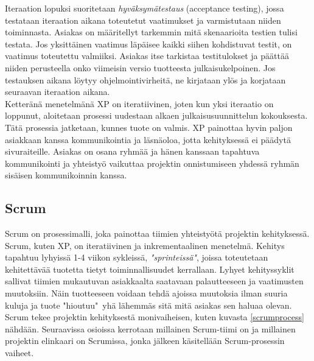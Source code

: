 \documentclass[finnish]{../tktltiki2}
\theoremstyle{definition}
\theoremstyle{remark}
\begin{document}
Iteraation lopuksi suoritetaan \emph{hyväksymätestaus} (acceptance testing), jossa testataan iteraation aikana toteutetut vaatimukset ja varmistutaan niiden toiminnasta. Asiakas on määritellyt tarkemmin mitä skenaarioita testien tulisi testata. Jos yksittäinen vaatimus läpäisee kaikki siihen kohdistuvat testit, on vaatimus toteutettu valmiiksi. Asiakas itse tarkistaa testitulokset ja päättää niiden perusteella onko viimeisin versio tuotteesta julkaisukelpoinen. Jos testauksen aikana löytyy ohjelmointivirheitä, ne kirjataan ylös ja korjataan seuraavan iteraation aikana.\\

Ketteränä menetelmänä XP on iteratiivinen, joten kun yksi iteraatio on loppunut, aloitetaan prosessi uudestaan alkaen julkaisusuunnittelun kokouksesta. Tätä prosessia jatketaan, kunnes tuote on valmis. XP painottaa hyvin paljon asiakkaan kanssa kommunikointia ja läsnäoloa, jotta kehityksessä ei päädytä sivuraiteille. Asiakas on osana ryhmää ja hänen kanssaan tapahtuva kommunikointi ja yhteistyö vaikuttaa projektin onnistumiseen yhdessä ryhmän sisäisen kommunikoinnin kanssa.

\subsection{Scrum}

Scrum on prosessimalli, joka painottaa tiimien yhteistyötä projektin 
kehityksessä. Scrum, kuten XP, on iteratiivinen 
ja inkrementaalinen menetelmä.
Kehitys tapahtuu lyhyissä 1-4 viikon sykleissä, 
\emph{"sprinteissä"}, joissa toteutetaan kehitettävää tuotetta tietyt 
toiminnallisuudet kerrallaan. Lyhyet kehityssyklit sallivat tiimien 
mukautuvan asiakkaalta saatavaan palautteeseen ja vaatimusten 
muutoksiin. Näin tuotteeseen voidaan tehdä ajoissa
muutoksia ilman suuria kuluja ja tuote "hioutuu"~yhä lähemmäs sitä 
mitä asiakas sen haluaa olevan. Scrum tekee projektin kehityksestä
monivaiheisen, kuten kuvasta \ref{scrumprocess} nähdään. Seuraavissa osioissa kerrotaan millainen Scrum-tiimi
on ja millainen projektin elinkaari on Scrumissa, jonka jälkeen käsitellään Scrum-prosessin vaiheet.
\end{document}
